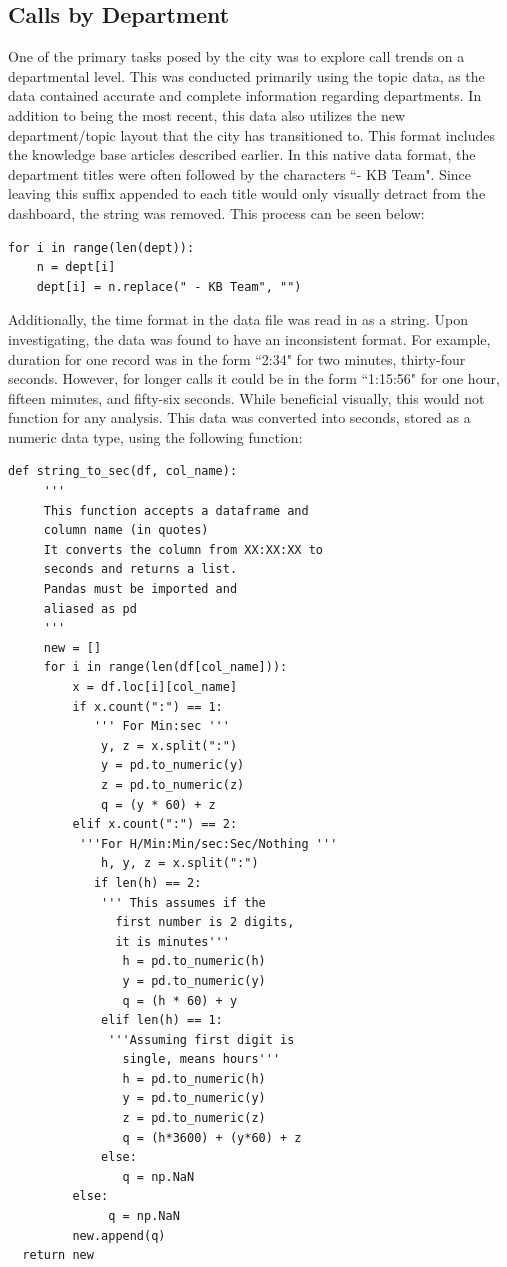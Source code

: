 \documentclass[11pt,twocolumn]{article}
\begin{document}
	\subsection{Calls by Department}

One of the primary tasks posed by the city was to explore call trends on a departmental level.  This was conducted primarily using the topic data, as the data contained accurate and complete information regarding departments.  In addition to being the most recent, this data also utilizes the new department/topic layout that the city has transitioned to.  This format includes the knowledge base articles described earlier.  In this native data format, the department titles were often followed by the characters ``- KB Team".  Since leaving this suffix appended to each title would only visually detract from the dashboard, the string was removed.  This process can be seen below:\\

  \begin{Verbatim}[fontsize=\small]
  for i in range(len(dept)):
    n = dept[i]
    dept[i] = n.replace(" - KB Team", "")
  \end{Verbatim}


Additionally, the time format in the data file was read in as a string.  Upon investigating, the data was found to have an inconsistent format.  For example, duration for one record was in the form ``2:34" for two minutes, thirty-four seconds.  However, for longer calls it could be in the form ``1:15:56" for one hour, fifteen minutes, and fifty-six seconds.  While beneficial visually, this would not function for any analysis.  This data was converted into seconds, stored as a numeric data type, using the following function:

  \begin{Verbatim}[fontsize=\small]
 def string_to_sec(df, col_name):
     ''' 
     This function accepts a dataframe and 
     column name (in quotes)
     It converts the column from XX:XX:XX to
     seconds and returns a list.
     Pandas must be imported and 
     aliased as pd
     '''
     new = []
     for i in range(len(df[col_name])):
         x = df.loc[i][col_name]
         if x.count(":") == 1:
            ''' For Min:sec '''
             y, z = x.split(":")
             y = pd.to_numeric(y)
             z = pd.to_numeric(z)
             q = (y * 60) + z
         elif x.count(":") == 2:
          '''For H/Min:Min/sec:Sec/Nothing '''
             h, y, z = x.split(":")
            if len(h) == 2:
             ''' This assumes if the
               first number is 2 digits,
               it is minutes'''
                h = pd.to_numeric(h)
                y = pd.to_numeric(y)
                q = (h * 60) + y
             elif len(h) == 1:
              '''Assuming first digit is 
                single, means hours'''
                h = pd.to_numeric(h)
                y = pd.to_numeric(y)
                z = pd.to_numeric(z)
                q = (h*3600) + (y*60) + z
             else:
                q = np.NaN
         else:
              q = np.NaN
         new.append(q)
  return new
  \end{Verbatim}
\end{document}
